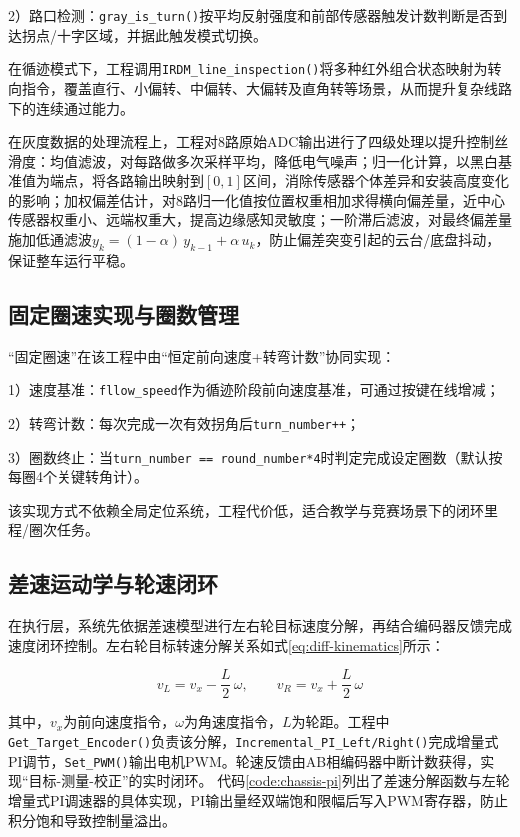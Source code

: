 2）路口检测：\texttt{gray\_is\_turn()}按平均反射强度和前部传感器触发计数判断是否到达拐点/十字区域，并据此触发模式切换。

在循迹模式下，工程调用\texttt{IRDM\_line\_inspection()}将多种红外组合状态映射为转向指令，覆盖直行、小偏转、中偏转、大偏转及直角转等场景，从而提升复杂线路下的连续通过能力。

在灰度数据的处理流程上，工程对8路原始ADC输出进行了四级处理以提升控制丝滑度：均值滤波，对每路做多次采样平均，降低电气噪声；归一化计算，以黑白基准值为端点，将各路输出映射到$[0,1]$区间，消除传感器个体差异和安装高度变化的影响；加权偏差估计，对8路归一化值按位置权重相加求得横向偏差量，近中心传感器权重小、远端权重大，提高边缘感知灵敏度；一阶滞后滤波，对最终偏差量施加低通滤波$y_k = (1-\alpha)\,y_{k-1}+\alpha\,u_k$，防止偏差突变引起的云台/底盘抖动，保证整车运行平稳。

\subsection{固定圈速实现与圈数管理}

“固定圈速”在该工程中由“恒定前向速度+转弯计数”协同实现：

1）速度基准：\texttt{fllow\_speed}作为循迹阶段前向速度基准，可通过按键在线增减；

2）转弯计数：每次完成一次有效拐角后\texttt{turn\_number++}；

3）圈数终止：当\texttt{turn\_number == round\_number*4}时判定完成设定圈数（默认按每圈4个关键转角计）。

该实现方式不依赖全局定位系统，工程代价低，适合教学与竞赛场景下的闭环里程/圈次任务。

\subsection{差速运动学与轮速闭环}

在执行层，系统先依据差速模型进行左右轮目标速度分解，再结合编码器反馈完成速度闭环控制。左右轮目标转速分解关系如式\eqref{eq:diff-kinematics}所示：

\begin{equation}
v_L = v_x - \frac{L}{2}\,\omega,\qquad
v_R = v_x + \frac{L}{2}\,\omega
\label{eq:diff-kinematics}
\end{equation}

其中，\(v_x\)为前向速度指令，\(\omega\)为角速度指令，\(L\)为轮距。工程中\texttt{Get\_Target\_Encoder()}负责该分解，\texttt{Incremental\_PI\_Left/Right()}完成增量式PI调节，\texttt{Set\_PWM()}输出电机PWM。轮速反馈由AB相编码器中断计数获得，实现“目标-测量-校正”的实时闭环。
代码\ref{code:chassis-pi}列出了差速分解函数与左轮增量式PI调速器的具体实现，PI输出量经双端饱和限幅后写入PWM寄存器，防止积分饱和导致控制量溢出。

